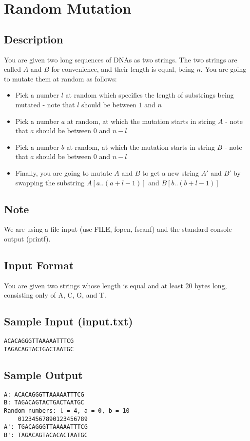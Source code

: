 \newpage


\section{Random Mutation}

\subsection*{Description}
You are given two long sequences of DNAs as two strings.  The two strings are called $A$ and $B$ for convenience, and their length is equal, being $n$.
You are going to mutate them at random as follows:
\begin{itemize}
  \item Pick a number $l$ at random which specifies the length of substrings being mutated - note that $l$ should be between $1$ and $n$
  \item Pick a number $a$ at random, at which the mutation starts in string $A$ - note that $a$ should be between $0$ and $n - l$
  \item Pick a number $b$ at random, at which the mutation starts in string $B$ - note that $a$ should be between $0$ and $n - l$
  \item Finally, you are going to mutate $A$ and $B$ to get a new string $A'$ and $B'$ by swapping the substring $A[a .. (a+l-1)]$ and $B[b .. (b+l-1)]$
\end{itemize}

\subsection*{Note}
We are using a file input (use FILE, fopen, fscanf) and the standard console output (printf).

\subsection*{Input Format}
You are given two strings whose length is equal and at least 20 bytes long, consisting only of A, C, G, and T.

\subsection*{Sample Input (input.txt)}
\begin{verbatim}
ACACAGGGTTAAAAATTTCG
TAGACAGTACTGACTAATGC
\end{verbatim}

\subsection*{Sample Output}
\begin{verbatim}
A: ACACAGGGTTAAAAATTTCG
B: TAGACAGTACTGACTAATGC
Random numbers: l = 4, a = 0, b = 10
    01234567890123456789
A': TGACAGGGTTAAAAATTTCG
B': TAGACAGTACACACTAATGC
\end{verbatim}





